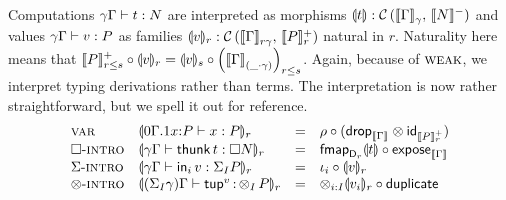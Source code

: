 \documentclass[acmsmall,review,anonymous]{acmart}\settopmatter{printfolios=true,printccs=false,printacmref=false}
\begin{document}
Computations $\gamma\Gamma \vdash t : N$ are interpreted as morphisms
$\llparenthesis t\rrparenthesis : \mathcal{C}\,(\llbracket\Gamma\rrbracket^{}_{\gamma},\,\llbracket N\rrbracket^{-})$ and values
$\gamma\Gamma \vdash v : P$ as families
$\llparenthesis v\rrparenthesis_{r} : \mathcal{C}\,(\llbracket\Gamma\rrbracket^{}_{r\gamma},\,\llbracket P\rrbracket^{+}_{r})$ natural in $r$.
Naturality here means that
$\llbracket P\rrbracket^{+}_{r \leq s} \circ \llparenthesis v\rrparenthesis_{r} = \llparenthesis v\rrparenthesis_{s} \circ \left(\llbracket\Gamma\rrbracket^{}_{(\_
    \cdot \gamma)}\right)_{r \leq s}$.
Again, because of $\mbox{\textsc{weak}}$, we interpret typing derivations rather than terms.
The interpretation is now rather straightforward, but we spell it out for reference.
\[
\begin{array}{llcl}
\rvar %
  & \denv {\ValTy{\qext 0 \Gamma 1 x P} x P} r
  & = & \Gr \comp (\tdrop[\den\Gamma] \otimes \tid[\Denp P r])
\\
\rintro\Box
  & \denv {\qValTy \gamma \Gamma {\thunk t} {\Box N}} r
  & = & \fmapt[{\D[r]}]{\dent t} \comp \expose[\den \Gamma]
\\
\rintro\GS
  & \denv{\qValTy \gamma \Gamma {\inj i v} {\sumt I P}} r
  & = & \iota_i \comp \denv v r
\\
\rintro\otimes
  & \denv{\pValTy {\sumt I \gamma} \Gamma {\tup v} {\tupt I P}} r
  & = & \tupt {i:I} \denv {v_i}r \comp \duplicate
\\
\end{array}
\]
\end{document}
